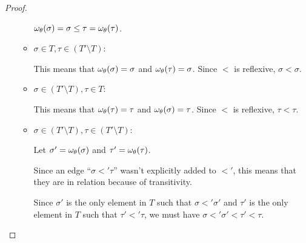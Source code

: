 \documentclass[main.tex]{subfiles}
\begin{document}
\begin{proof}
\begin{itemize}
\begin{itemize}
                    $\omega_{\theta}(\sigma) = \sigma \leq \tau = \omega_{\theta}(\tau)$.
                \item $\sigma \in T, \tau \in (T' \setminus T)$:

                    This means that $\omega_{\theta}(\sigma) = \sigma$
                    and $\omega_{\theta}(\tau) = \sigma$. Since $\less$ is
                    reflexive, $\sigma \less \sigma$.
                \item $\sigma \in (T' \setminus T), \tau \in T$:

                    This means that $\omega_{\theta}(\tau) = \tau$
                    and $\omega_{\theta}(\sigma) = \tau$. Since $\less$ is
                    reflexive, $\tau \less \tau$.
                \item $\sigma \in (T' \setminus T), \tau \in (T' \setminus T)$:

                    Let $\sigma' = \omega_{\theta}(\sigma)$
                    and $\tau' = \omega_{\theta}(\tau)$.

                    Since an edge ``$\sigma \less' \tau$''
                    wasn't explicitly added to $\less'$, this means that they
                    are in relation because of transitivity.

                    Since $\sigma'$ is the only element in $T$ such that
                    $\sigma \less' \sigma'$ and $\tau'$ is the only element in $T$
                    such that $\tau' \less' \tau$, we must have
                    $\sigma \less' \sigma' \less \tau' \less \tau$.
            \end{itemize}
    \end{itemize}
\end{proof}
\end{document}
